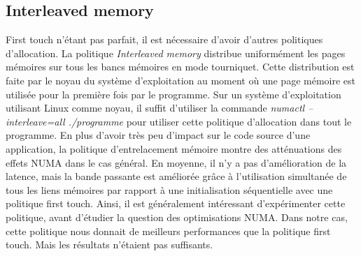 \subsection{Interleaved memory}
First touch n'étant pas parfait, il est nécessaire d'avoir d'autres politiques d'allocation.
%
La politique {\em Interleaved memory} distribue uniformément les pages mémoires sur tous les bancs mémoires en mode tourniquet.
%
Cette distribution est faite par le noyau du système d'exploitation au moment où une page mémoire est utilisée pour la première fois par le programme.
%
Sur un système d'exploitation utilisant Linux comme noyau, il suffit d'utiliser la commande {\em numactl --interleave=all ./programme} pour utiliser cette politique d'allocation dans tout le programme.
%
En plus d'avoir très peu d'impact sur le code source d'une application, la politique d'entrelacement mémoire montre des atténuations des effets NUMA dans le cas général.
%
En moyenne, il n'y a pas d'amélioration de la latence, mais la bande passante est améliorée grâce à l'utilisation simultanée de tous les liens mémoires par rapport à une initialisation séquentielle avec une politique first touch.
%
Ainsi, il est généralement intéressant d'expérimenter cette politique, avant d'étudier la question des optimisations NUMA.
%
Dans notre cas, cette politique nous donnait de meilleurs performances que la politique first touch.
%
Mais les résultats n'étaient pas suffisants.
